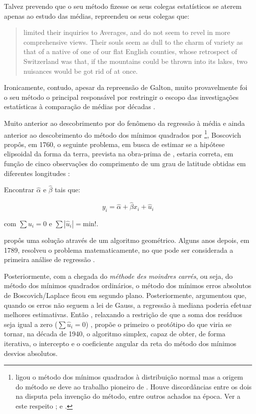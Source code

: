 \documentclass[a4paper, 12pt]{article}
\let\rmarkdownfootnote\footnote%
\def\footnote{\protect\rmarkdownfootnote}
\begin{document}
Talvez prevendo que o seu método fizesse os seus colegas estatísticos se
aterem apenas ao estudo das médias, \textcite[p.~62]{galton}
\autocite[\emph{apud}][p.~350]{koenker2000} repreendeu os seus colegas
que:

\begin{quote}
limited their inquiries to Averages, and do not seem to revel in more
comprehensive views. Their souls seem as dull to the charm of variety as
that of a native of one of our flat English counties, whose retrospect
of Switzerland was that, if the mountains could be thrown into its
lakes, two nuisances would be got rid of at once.
\end{quote}

Ironicamente, contudo, apesar da repreensão de Galton, muito
provavelmente foi o seu método o principal responsável por restringir o
escopo das investigações estatísticas à comparação de médias por décadas
\autocite[350]{koenker2000}.

Muito anterior ao descobrimento por \textcite{galton} do fenômeno da
regressão à média e ainda anterior ao descobrimento do método dos
mínimos quadrados por \textcite{legendre1805} \footnote{\textcite{gauss1809}
  ligou o método dos mínimos quadrados à distribuição normal mas a
  origem do método se deve ao trabalho pioneiro de
  \textcite{legendre1805}. Houve discordâncias entre os dois na disputa
  pela invenção do método, entre outros achados na época. Ver a este
  respeito \textcite{STIGLER197731}; \textcite{stigler1981} e
  \textcite{stigler1986}.}, Boscovich propôs, em 1760, o seguinte
problema, em busca de estimar se a hipótese elipsoidal da forma da
terra, prevista na obra-prima de \textcite{newton}, estaria correta, em
função de cinco observações do comprimento de um grau de latitude
obtidas em diferentes longitudes
\autocites[p.~353]{koenker2000}[p.~281]{tortoise}[p.~40]{stigler1986}:

Encontrar \(\hat \alpha\) e \(\hat \beta\) tais que:

\[y_i = \hat \alpha + \hat \beta x_i + \hat u_i\]

com \(\sum \hat u_i = 0\) e \(\sum |\hat u_i| = \text{min!}\).

\textcite{boscovich} propôs uma solução através de um algoritmo
geométrico. Alguns anos depois, em 1789, \textcite{laplace1789} resolveu
o problema matematicamente, no que pode ser considerada a primeira
análise de regressão \autocite[281]{tortoise}.

Posteriormente, com a chegada do \emph{méthode des moindres carrés}, ou
seja, do método dos mínimos quadrados ordinários, o método dos mínimos
erros absolutos de Boscovich/Laplace ficou em segundo plano.
Posteriormente, \textcite{edgeworth1887} argumentou que, quando os erros
não seguem a lei de Gauss, a regressão à mediana poderia efetuar
melhores estimativas. Então \textcite{edgeworth1888}, relaxando a
restrição de que a soma dos resíduos seja igual a zero
(\(\sum \hat u_i = 0\)) \autocite[281]{tortoise}, propõe o primeiro o
protótipo do que viria se tornar, na década de 1940, o algoritmo
simplex, capaz de obter, de forma iterativa, o intercepto e o
coeficiente angular da reta do método dos mínimos desvios absolutos.
\end{document}
